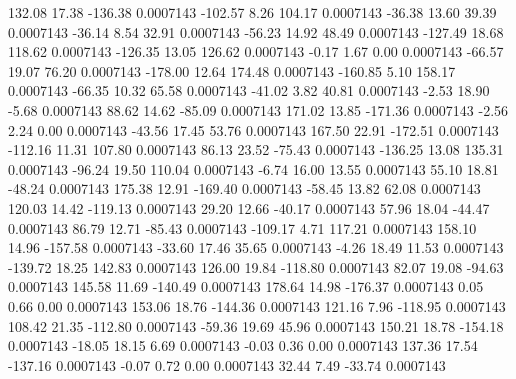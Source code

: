       132.08       17.38     -136.38     0.0007143
     -102.57        8.26      104.17     0.0007143
      -36.38       13.60       39.39     0.0007143
      -36.14        8.54       32.91     0.0007143
      -56.23       14.92       48.49     0.0007143
     -127.49       18.68      118.62     0.0007143
     -126.35       13.05      126.62     0.0007143
       -0.17        1.67        0.00     0.0007143
      -66.57       19.07       76.20     0.0007143
     -178.00       12.64      174.48     0.0007143
     -160.85        5.10      158.17     0.0007143
      -66.35       10.32       65.58     0.0007143
      -41.02        3.82       40.81     0.0007143
       -2.53       18.90       -5.68     0.0007143
       88.62       14.62      -85.09     0.0007143
      171.02       13.85     -171.36     0.0007143
       -2.56        2.24        0.00     0.0007143
      -43.56       17.45       53.76     0.0007143
      167.50       22.91     -172.51     0.0007143
     -112.16       11.31      107.80     0.0007143
       86.13       23.52      -75.43     0.0007143
     -136.25       13.08      135.31     0.0007143
      -96.24       19.50      110.04     0.0007143
       -6.74       16.00       13.55     0.0007143
       55.10       18.81      -48.24     0.0007143
      175.38       12.91     -169.40     0.0007143
      -58.45       13.82       62.08     0.0007143
      120.03       14.42     -119.13     0.0007143
       29.20       12.66      -40.17     0.0007143
       57.96       18.04      -44.47     0.0007143
       86.79       12.71      -85.43     0.0007143
     -109.17        4.71      117.21     0.0007143
      158.10       14.96     -157.58     0.0007143
      -33.60       17.46       35.65     0.0007143
       -4.26       18.49       11.53     0.0007143
     -139.72       18.25      142.83     0.0007143
      126.00       19.84     -118.80     0.0007143
       82.07       19.08      -94.63     0.0007143
      145.58       11.69     -140.49     0.0007143
      178.64       14.98     -176.37     0.0007143
        0.05        0.66        0.00     0.0007143
      153.06       18.76     -144.36     0.0007143
      121.16        7.96     -118.95     0.0007143
      108.42       21.35     -112.80     0.0007143
      -59.36       19.69       45.96     0.0007143
      150.21       18.78     -154.18     0.0007143
      -18.05       18.15        6.69     0.0007143
       -0.03        0.36        0.00     0.0007143
      137.36       17.54     -137.16     0.0007143
       -0.07        0.72        0.00     0.0007143
       32.44        7.49      -33.74     0.0007143
